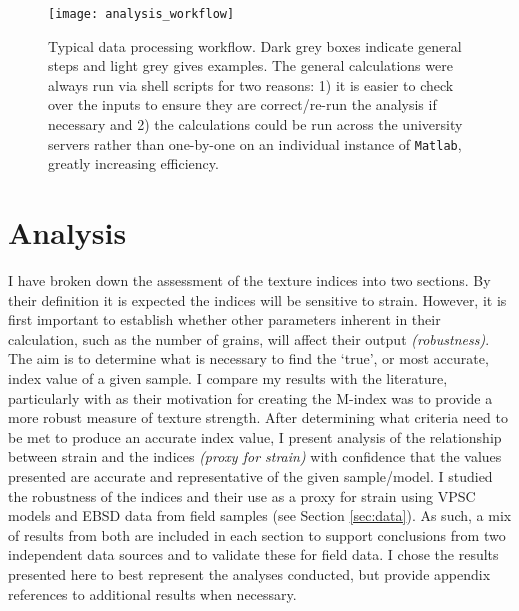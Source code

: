 \documentclass[a4paper,12pt,twoside]{report}
\numberwithin{equation}{chapter}
\begin{document}
\begin{figure*}[p]
  \centering
    \texttt{[image: analysis\_workflow]}
  \caption[Typical data processing workflow]{Typical data processing workflow. Dark grey boxes indicate general steps and light grey gives examples. The general calculations were always run via shell scripts for two reasons: 1) it is easier to check over the inputs to ensure they are correct/re-run the analysis if necessary and 2) the calculations could be run across the university servers rather than one-by-one on an individual instance of \texttt{Matlab}, greatly increasing efficiency.}
  \label{fig:analysis_workflow}
\end{figure*}


\chapter{Analysis} \label{chap:analysis}
\vspace{-1cm}
I have broken down the assessment of the texture indices into two sections. By their definition it is expected the indices will be sensitive to strain. However, it is first important to establish whether other parameters inherent in their calculation, such as the number of grains, will affect their output \emph{(robustness)}. The aim is to determine what is necessary to find the \lq{}true\rq{}, or most accurate, index value of a given sample. I compare my results with the literature, particularly with \cite{Skemer} as their motivation for creating the M-index was to provide a more robust measure of texture strength. After determining what criteria need to be met to produce an accurate index value, I present analysis of the relationship between strain and the indices \emph{(proxy for strain)} with confidence that the values presented are accurate and representative of the given sample/model. I studied the robustness of the indices and their use as a proxy for strain using VPSC models and EBSD data from field samples (see Section \ref{sec:data}). As such, a mix of results from both are included in each section to support conclusions from two independent data sources and to validate these for field data. I chose the results presented here to best represent the analyses conducted, but provide appendix references to additional results when necessary.       
\end{document}
